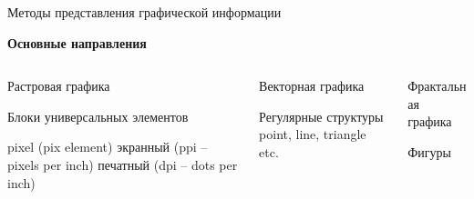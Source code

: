 \documentclass{beamer}
\begin{document}
	\begin{frame}{Методы представления графической информации}
		
		\centering
		\textbf{Основные направления}
		
		\begin{columns}
			\begin{column}{0.3\textwidth}
				
				Растровая графика
				
				Блоки универсальных элементов
				
				pixel (pix element)
				экранный (ppi – pixels per inch)
				печатный (dpi – dots per inch)
				
			\end{column}
			
			\begin{column}{0.4\textwidth}
				
				Векторная графика

				Регулярные структуры
				point, line, triangle etc.

				
			\end{column}
			
			\begin{column}{0.3\textwidth}
				
				Фрактальная графика

				Фигуры
				
				
			\end{column}
		\end{columns}

	\end{frame}
	\fi
\end{document}
